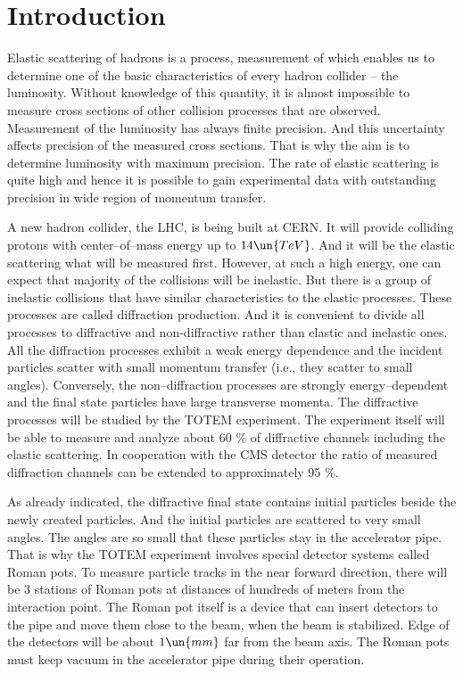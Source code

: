 \section{Introduction}

Elastic scattering of hadrons is a process, measurement of which enables us to determine one of the basic characteristics of every hadron collider -- the luminosity. Without knowledge of this quantity, it is almost impossible to measure cross sections of other collision processes that are observed. Measurement of the luminosity has always finite precision. And this uncertainty affects precision of the measured cross sections. That is why the aim is to determine luminosity with maximum precision. The rate of elastic scattering is quite high and hence it is possible to gain experimental data with outstanding precision in wide region of momentum transfer.

A new hadron collider, the LHC, is being built at CERN. It will provide colliding protons with center--of--mass energy up to $14\un{TeV}$. And it will be the elastic scattering what will be measured first. However, at such a high energy, one can expect that majority of the collisions will be inelastic. But there is a group of inelastic collisions that have similar characteristics to the elastic processes. These processes are called diffraction production. And it is convenient to divide all processes to diffractive and non-diffractive rather than elastic and inelastic ones. All the diffraction processes exhibit a weak energy dependence and the incident particles scatter with small momentum transfer (i.e., they scatter to small angles). Conversely, the non--diffraction processes are strongly energy--dependent and the final state particles have large transverse momenta. The diffractive processes will be studied by the TOTEM experiment. The experiment itself will be able to measure and analyze about 60 \%
of diffractive channels including the elastic scattering. In cooperation with the CMS detector the ratio of measured diffraction channels can be extended to approximately 95 \%.

As already indicated, the diffractive final state contains initial particles beside the newly created particles. And the initial particles are scattered to very small angles. The angles are so small that these particles stay in the accelerator pipe. That is why the TOTEM experiment involves special detector systems called Roman pots. To measure particle tracks in the near forward direction, there will be 3 stations of Roman pots at distances of hundreds of meters from the interaction point. The Roman pot itself is a device that can insert detectors to the pipe and move them close to the beam, when the beam is stabilized. Edge of the detectors will be about $1\un{mm}$ far from the beam axis. The Roman pots must keep vacuum in the accelerator pipe during their operation.

